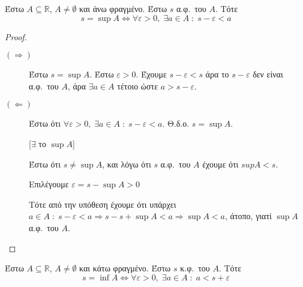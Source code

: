 \begin{mybox3}
\begin{prop}
  Έστω $ A \subseteq \mathbb{R} $, $ A \neq \emptyset $ και άνω φραγμένο. 
  Έστω $ s $ α.φ.\ του $A$. Τότε 
  \[
    s= \sup A \Leftrightarrow \forall \varepsilon >0, \; \exists a \in A \; 
    : \; s - \varepsilon < a
  \]
\end{prop}
\end{mybox3}
\begin{proof}
\item {}
  \begin{description}
    \item[$ (\Rightarrow) $] 
      Έστω $ s = \sup A $. Έστω $ \varepsilon >0 $. Έχουμε $ 
      s - \varepsilon < s $ άρα το $ s- \varepsilon $ δεν είναι 
      α.φ.\ του $A$, άρα $ \exists a \in A $ τέτοιο ώστε $ 
      a > s- \varepsilon$. 

    \item [$ (\Leftarrow) $] 
      Έστω ότι $ \forall \varepsilon >0, \; \exists a \in A \; : 
      \; s- \varepsilon < a$. Θ.δ.ο. $ s = \sup A $. 

      \begin{minipage}{0.18\textwidth}
      \end{minipage}

      [$ \exists $ το $ \sup A $]

      Έστω ότι $ s \neq \sup A $, και λόγω ότι $ s $ α.φ.\ του $A$ 
      έχουμε ότι $sup A < s $. 

      Επιλέγουμε $ \varepsilon = s - \sup A > 0 $

      Τότε από την υπόθεση έχουμε ότι 
      υπάρχει $ a \in A \; : \; s - \varepsilon < a \Rightarrow s 
      - s + \sup A < a \Rightarrow \sup A < a $, άτοπο, γιατί 
      $ \sup A $ α.φ.\ του $A$.  
  \end{description} 
\end{proof}

\begin{mybox3}
\begin{prop}
  Έστω $ A \subseteq \mathbb{R} $, $ A \neq \emptyset $ και κάτω  φραγμένο. 
  Έστω $ s $ κ.φ.\ του $A$. Τότε 
  \[
    s= \inf A \Leftrightarrow \forall \varepsilon >0, \; \exists a \in A \; 
    : \; a < s + \varepsilon  
  \]
\end{prop}
\end{mybox3}

